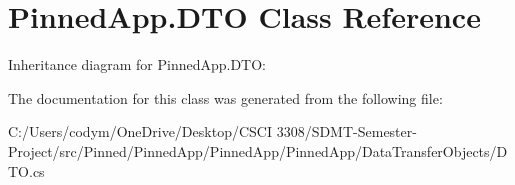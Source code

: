 \hypertarget{class_pinned_app_1_1_d_t_o}{}\section{Pinned\+App.\+D\+TO Class Reference}
\label{class_pinned_app_1_1_d_t_o}


Inheritance diagram for Pinned\+App.\+D\+TO\+:


The documentation for this class was generated from the following file\+:\begin{DoxyCompactItemize}
\item 
C\+:/\+Users/codym/\+One\+Drive/\+Desktop/\+C\+S\+C\+I 3308/\+S\+D\+M\+T-\/\+Semester-\/\+Project/src/\+Pinned/\+Pinned\+App/\+Pinned\+App/\+Pinned\+App/\+Data\+Transfer\+Objects/D\+T\+O.\+cs\end{DoxyCompactItemize}
